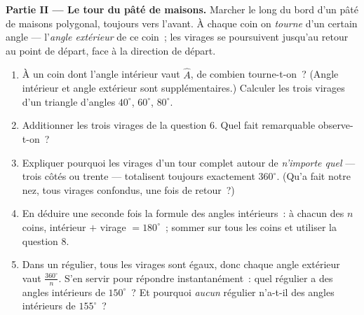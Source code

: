 \begin{problem}
\medskip
\noindent\textbf{Partie II --- Le tour du pâté de maisons.}
Marcher le long du bord d'un pâté de maisons polygonal, toujours vers
l'avant. À chaque coin on \emph{tourne} d'un certain angle ---
l'\emph{angle extérieur} de ce coin~; les virages se poursuivent
jusqu'au retour au point de départ, face à la direction de départ.
\begin{enumerate}[resume]
  \item À un coin dont l'angle intérieur vaut $\widehat A$, de
        combien tourne-t-on~? (Angle intérieur et angle extérieur
        sont supplémentaires.) Calculer les trois virages d'un
        triangle d'angles $40^\circ$, $60^\circ$, $80^\circ$.
  \item Additionner les trois virages de la question 6. Quel fait
        remarquable observe-t-on~?
  \item Expliquer pourquoi les virages d'un tour complet autour de
        \emph{n'importe quel}  --- trois côtés ou trente ---
        totalisent toujours exactement $360^\circ$. (Qu'a fait notre
        nez, tous virages confondus, une fois de retour~?)
  \item En déduire une seconde fois la formule des angles
        intérieurs~: à chacun des $n$ coins, intérieur $+$ virage
        $= 180^\circ$~; sommer sur tous les coins et utiliser la
        question 8.
  \item Dans un  régulier, tous les virages sont égaux, donc
        chaque angle extérieur vaut $\frac{360^\circ}{n}$. S'en
        servir pour répondre instantanément~: quel  régulier
        a des angles intérieurs de $150^\circ$~? Et pourquoi
        \emph{aucun}  régulier n'a-t-il des angles
        intérieurs de $155^\circ$~?
\end{enumerate}


\end{problem}
